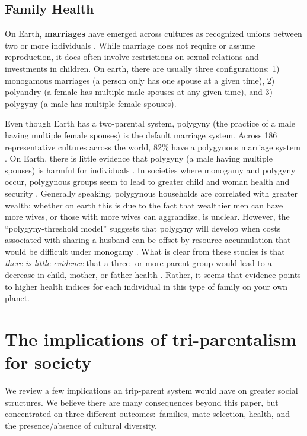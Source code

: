 \documentclass{report}
\begin{document}
\subsection*{Family Health}
On Earth, \textbf{marriages} have emerged across cultures as recognized unions between two or more individuals \cite{Fortunato2015}. While marriage does not require or assume reproduction, it does often involve restrictions on sexual relations and investments in children. On earth, there are usually three configurations: 1) monogamous marriages (a person only has one spouse at a given time), 2) polyandry (a female has multiple male spouses at any given time), and 3) polygyny (a male has multiple female spouses). 

Even though Earth has a two-parental system, polygyny (the practice of a male having multiple female spouses) is the default marriage system. Across 186 representative cultures across the world, 82\% have a polygynous marriage system \cite{Fortunato2015, Fortunato2009}. On Earth, there is little evidence that polygyny (a male having multiple spouses) is harmful for individuals \cite{Mulder1990, Sear2002, Lawson13827}. In societies where monogamy and polygyny occur, polygynous groups seem to lead to greater child and woman health and security \cite{Mulder1990}. Generally speaking, polygynous households are correlated with greater wealth; whether on earth this is due to the fact that wealthier men can have more wives, or those with more wives can aggrandize, is unclear. However, the “polygyny-threshold model” suggests that polygyny will develop when costs associated with sharing a husband can be offset by resource accumulation that would be difficult under monogamy \cite{Lawson13827}. What is clear from these studies is that \textit{there is little evidence} that a three- or more-parent group would lead to a decrease in child, mother, or father health \cite{Lawson13827, Mulder1990}. Rather, it seems that evidence points to higher health indices for each individual in this type of family on your own planet.

\section*{The implications of tri-parentalism for society}

We review a few implications an trip-parent system would have on greater social structures. We believe there are many consequences beyond this paper, but concentrated on three different outcomes:\ families, mate selection, health, and the presence/absence of cultural diversity.
\end{document}
